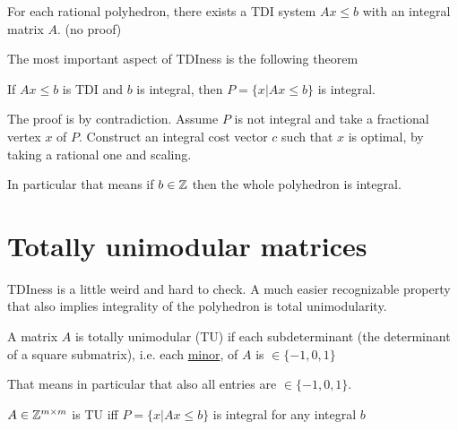 \begin{thm} For each rational polyhedron, there exists a TDI system $Ax\leq b$ with an integral matrix $A$. {\small (no proof)}
\end{thm}

The most important aspect of TDIness is the following theorem

\begin{thm} If $Ax\leq b$ is TDI and $b$ is integral, then $P=\{x|Ax\leq b\}$ is integral.
\end{thm}

\begin{pr} The proof is by contradiction. Assume $P$ is not integral and take a fractional vertex $x$ of $P$. Construct an integral cost vector $c$ such that $x$ is optimal, by taking a rational one and scaling.

In particular that means if $b\in \mathbb{Z}$ then the whole polyhedron is integral.
\end{pr}

\section{Totally unimodular matrices}

TDIness is a little weird and hard to check. A much easier recognizable property that also implies integrality of the polyhedron is total unimodularity.

\begin{Def} A matrix $A$ is totally unimodular (TU) if each subdeterminant (the determinant of a square submatrix), i.e. each \href{http://en.wikipedia.org/wiki/Minor\_\%28linear\_algebra\%29}{minor}, of $A$ is $\in \{-1,0,1\}$
\end{Def}

That means in particular that also all entries are $\in \{-1,0,1\}$.

\begin{thm} $A\in \mathbb{Z}^{m\times m}$ is TU iff $P=\{x|Ax\leq b\}$ is integral for any integral $b$
\end{thm}

